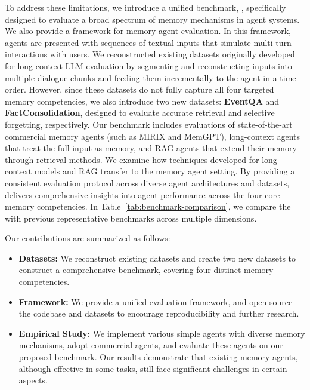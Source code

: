 To address these limitations, we introduce a unified benchmark, \textbf{\ours}, specifically designed to evaluate a broad spectrum of memory mechanisms in agent systems. We also provide a framework for memory agent evaluation. In this framework, agents are presented with sequences of textual inputs that simulate multi-turn interactions with users. We reconstructed existing datasets originally developed for long-context LLM evaluation by segmenting and reconstructing inputs into multiple dialogue chunks and feeding them incrementally to the agent in a time order. However, since these datasets do not fully capture all four targeted memory competencies, we also introduce two new datasets: \textbf{EventQA} and \textbf{FactConsolidation}, designed to evaluate accurate retrieval and selective forgetting, respectively.
Our benchmark includes evaluations of state-of-the-art commercial memory agents (such as MIRIX and MemGPT), long-context agents that treat the full input as memory, and RAG agents that extend their memory through retrieval methods. We examine how techniques developed for long-context models and RAG transfer to the memory agent setting. By providing a consistent evaluation protocol across diverse agent architectures and datasets, \ours delivers comprehensive insights into agent performance across the four core memory competencies. In Table~\ref{tab:benchmark-comparison}, we compare the \ours with previous representative benchmarks across multiple dimensions.


Our contributions are summarized as follows:
\begin{itemize}[leftmargin=*]
\item \textbf{Datasets:} We reconstruct existing datasets and create two new datasets to construct a comprehensive benchmark, covering four distinct memory competencies. 
\item \textbf{Framework:} We provide a unified evaluation framework, and open-source the codebase and datasets to encourage reproducibility and further research. 
\item \textbf{Empirical Study:} We implement various simple agents with diverse memory mechanisms, adopt commercial agents, and evaluate these agents on our proposed benchmark. Our results demonstrate that existing memory agents, although effective in some tasks, still face significant challenges in certain aspects.
\end{itemize}